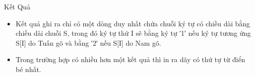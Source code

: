 Kết Quả
\begin{itemize}
	\item     Kết quả ghi ra chỉ có một dòng duy nhất chứa chuỗi ký tự có chiều dài bằng chiều dài chuỗi S, trong đó ký tự thứ I sẽ bằng ký tự ′1′ nếu ký tự tương ứng S[I] do Tuấn gõ và bằng ′2′ nếu S[I] do Nam gõ.   
	\item     Trong trường hợp có nhiều hơn một kết quả thì in ra dãy có thứ tự từ điển bé nhất.   
\end{itemize}